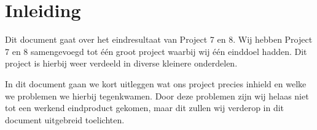 \chapter{Inleiding}
Dit document gaat over het eindresultaat van Project 7 en 8. Wij hebben Project 7 en 8 samengevoegd tot \'{e}\'{e}n groot project waarbij wij \'{e}\'{e}n einddoel hadden. Dit project is hierbij weer verdeeld in diverse kleinere onderdelen. 

In dit document gaan we kort uitleggen wat ons project precies inhield en welke we problemen we hierbij tegenkwamen. Door deze problemen zijn wij helaas niet tot een werkend eindproduct gekomen, maar dit zullen wij verderop in dit document uitgebreid toelichten.
